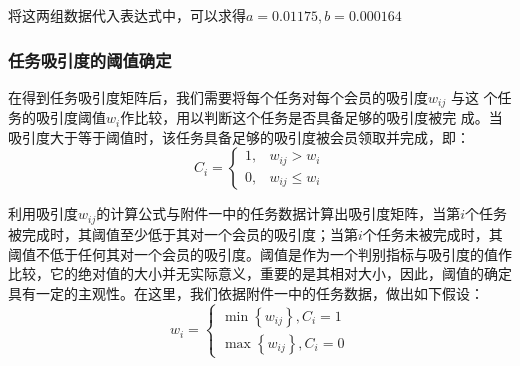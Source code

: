 将这两组数据代入表达式中，可以求得$a=0.01175,b=0.000164$

\subsubsection{任务吸引度的阈值确定}
在得到任务吸引度矩阵后，我们需要将每个任务对每个会员的吸引度$w_{ij}$ 与这
个任务的吸引度阈值$w_i$作比较，用以判断这个任务是否具备足够的吸引度被完
成。当吸引度大于等于阈值时，该任务具备足够的吸引度被会员领取并完成，即：
$$C_{i}=\left\{\begin{array}{ll}
        1, & w_{i j}>w_{i}      \\
        0, & w_{i j} \leq w_{i}
    \end{array}\right.$$

利用吸引度$w_{ij}$的计算公式与附件一中的任务数据计算出吸引度矩阵，当第$i$个任务被完成时，其阈值至少低于其对一个会员的吸引度；当第$i$个任务未被完成时，其阈值不低于任何其对一个会员的吸引度。阈值是作为一个判别指标与吸引度的值作比较，它的绝对值的大小并无实际意义，重要的是其相对大小，因此，阈值的确定具有一定的主观性。在这里，我们依据附件一中的任务数据，做出如下假设：
$$w_{i}=\left\{\begin{array}{l}
        \min \left\{w_{i j}\right\}, C_{i}=1 \\
        \max \left\{w_{i j}\right\}, C_{i}=0
    \end{array}\right.$$

